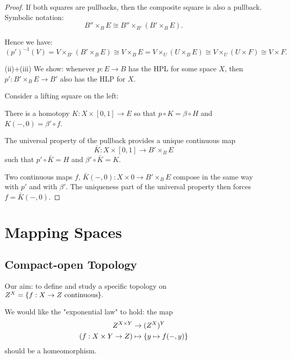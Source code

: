 \begin{proof}
If both squares are pullbacks, then the composite square is also a pullback. Symbolic notation:
\[B''\times_B E\cong B''\times_{B'}(B'\times_B E).\]

Hence we have:
\[(p')^{-1}(V)=V\times_{B'}(B'\times_B E)\cong V\times_B E = V\times_U(U\times_B E)\cong V\times_U(U\times F)\cong V\times F.\]

(ii)+(iii) We show: whenever $p:E\to B$ has the HPL for some space $X$, then $p':B'\times_B E\to B'$ also has the HLP for $X$.

Consider a lifting square on the left:
\begin{center}
\end{center}

There is a homotopy $K:X\times[0,1]\to E$ so that $p\circ K=\beta\circ H$ and $K(-,0)=\beta'\circ f$.

The universal property of the pullback provides a unique continuous map
\[\bar K:X\times[0,1]\to B'\times_B E\]
such that $p'\circ \bar K=H$ and $\beta'\circ\bar K=K$.

Two continuous maps $f,\,\bar K(-,0):X\times0\to B'\times_B E$ compose in the same way with $p'$ and with $\beta'$. The uniqueness part of the universal property then forces $f=\bar K(-,0)$.
\end{proof}

\chapter{Mapping Spaces}

\section{Compact-open Topology}

Our aim: to define and study a specific topology on $Z^X=\{f:X\to Z\text{ continuous}\}.$

We would like the "exponential law" to hold: the map
\begin{align*}
    Z^{X\times Y}&\to(Z^X)^Y\\
    (f:X\times Y\to Z)&\mapsto \{y\mapsto f(-,y)\}
\end{align*}
should be a homeomorphism.

